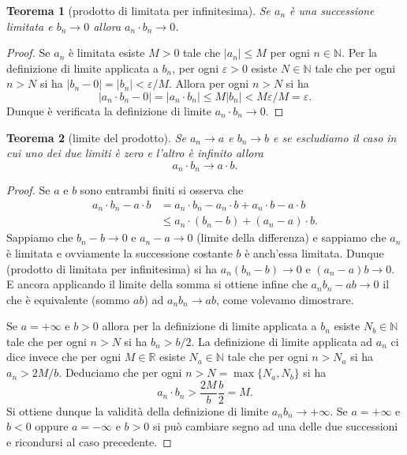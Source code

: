 \documentclass[italian,a4paper,oneside,headinclude]{scrbook}
\newcommand{\eps}{\varepsilon}
\newcommand{\NN}{\mathbb N}
\newcommand{\RR}{\mathbb R}
\newcommand{\abs}[1]{{\left|#1\right|}}
\newtheorem{theorem}{Teorema}
\begin{document}
\begin{theorem}[prodotto di limitata per infinitesima]
Se $a_n$ è una successione limitata e $b_n\to 0$ allora
$a_n\cdot b_n \to 0$.
\end{theorem}
%
\begin{proof}
Se $a_n$ è limitata esiste $M>0$ tale che $\abs{a_n}\le M$ per ogni $n\in\NN$.
Per la definizione di limite applicata a $b_n$, per ogni $\eps>0$
esiste $N\in \NN$ tale che per ogni $n>N$ si ha $\abs{b_n -0}=\abs{b_n} < \eps / M$. Allora per ogni $n>N$ si ha
\[
  \abs{a_n\cdot b_n - 0} = \abs{a_n\cdot b_n} \le M \abs{b_n} < M \eps /M = \eps.
\]
Dunque è verificata la definizione di limite $a_n \cdot b_n \to 0$.
\end{proof}

\begin{theorem}[limite del prodotto]
Se $a_n \to a$ e $b_n \to b$
e se escludiamo il caso in cui uno dei due limiti
è zero e l'altro è infinito
allora
\[
  a_n \cdot b_n \to a\cdot b.
\]
\end{theorem}
\begin{proof}
Se $a$ e $b$ sono entrambi finiti si osserva che
\begin{align*}
  a_n \cdot b_n - a\cdot b
  &= a_n \cdot b_n - a_n \cdot b + a_n \cdot b - a\cdot b\\
  &\le a_n \cdot(b_n - b) + (a_n -a) \cdot b.
\end{align*}
Sappiamo che $b_n - b \to 0$ e $a_n - a \to 0$ (limite della differenza)
e sappiamo che $a_n$ è limitata e ovviamente la successione costante $b$ è anch'essa limitata.
Dunque (prodotto di limitata per infinitesima) si ha $a_n(b_n-b)\to 0$ e $(a_n-a)b\to 0$. E ancora applicando il limite della somma si ottiene
infine che $a_n b_n - ab\to 0$ il che è equivalente (sommo $ab$) ad $a_n b_n\to ab$, come volevamo dimostrare.

Se $a = +\infty$ e $b>0$ allora per la definizione di limite applicata a $b_n$
esiste $N_b\in \NN$ tale che per ogni $n>N$ si ha $b_n > b/2$. La definizione
di limite applicata ad $a_n$ ci dice invece che per ogni $M\in \RR$
esiste $N_a\in \NN$ tale che per ogni $n>N_a$ si ha $a_n > 2M/b$.
Deduciamo che per ogni $n> N=\max\{N_a, N_b\}$ si ha
\[
  a_n\cdot b_n > \frac{2M}{b}\frac{b}{2} = M.
\]
Si ottiene dunque la validità della definizione di limite $a_n b_n\to +\infty$.
Se $a= +\infty$ e $b<0$ oppure $a=-\infty$ e $b>0$ si può cambiare segno
ad una delle due successioni e ricondursi al caso precedente.
\end{proof}
\end{document}
